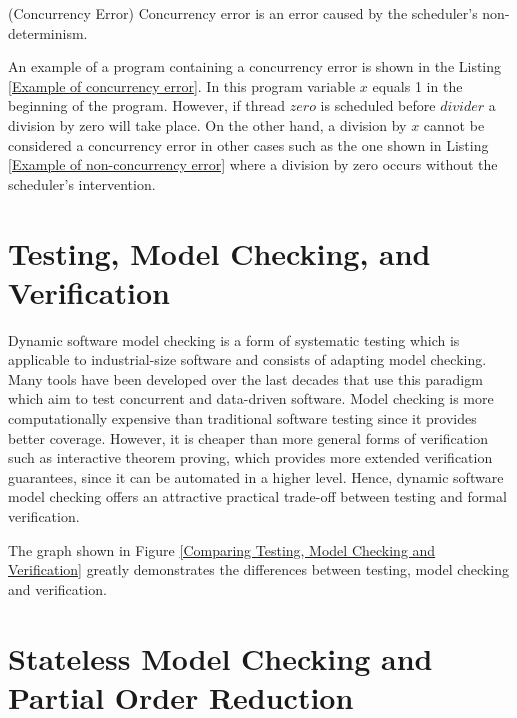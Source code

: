 \begin{definition}{(Concurrency Error)}
    Concurrency error is an error caused by the scheduler's non-determinism.
\end{definition}

An example of a program containing a concurrency error is shown in the Listing \ref{Example of concurrency error}. In this program variable $x$ equals 1 in the beginning of the program. However,
if thread $zero$ is scheduled before $divider$ a division by zero will take place. On the other hand, a division by $x$ cannot be considered a concurrency error in other cases
such as the one shown in Listing \ref{Example of non-concurrency error} where a division by zero occurs without the scheduler's intervention.


\section{Testing, Model Checking, and Verification}

Dynamic software model checking is a form of systematic testing which is applicable to industrial-size software and consists of adapting model checking.
Many tools have been developed over the last decades that use this paradigm which aim to test concurrent and data-driven software. Model checking is more computationally
expensive than traditional software testing since it provides better coverage. However, it is cheaper than more general forms of verification such as interactive theorem
proving, which provides more extended verification guarantees, since it can be automated in a higher level.
Hence, dynamic software model checking offers an attractive practical trade-off between testing and formal verification. 

The graph shown in Figure \ref{Comparing Testing, Model Checking and Verification} \cite{TestingvsVerification} greatly demonstrates the differences between testing, model checking and verification.


\section{Stateless Model Checking and Partial Order Reduction}

